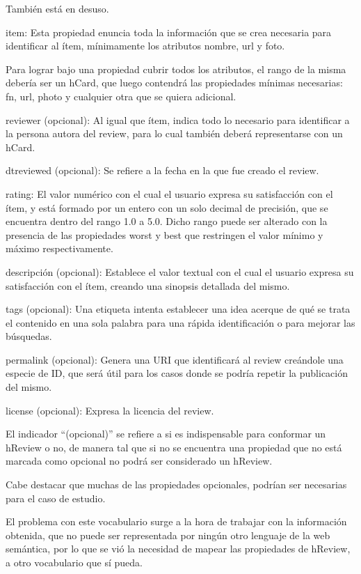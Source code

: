También está en desuso.

item: Esta propiedad enuncia toda la información que se crea necesaria para identificar al ítem, mínimamente los atributos nombre, url y foto.


Para lograr bajo una propiedad cubrir todos los atributos, el rango de la misma debería ser un hCard, que luego contendrá las propiedades mínimas necesarias: 
fn, url, photo y cualquier otra que se quiera adicional.

reviewer (opcional): Al igual que ítem, indica todo lo necesario para identificar a la persona autora del review, para lo cual también deberá representarse 
con un hCard. 

dtreviewed (opcional): Se refiere a la fecha en la que fue creado el review. 

rating: El valor numérico con el cual el usuario expresa su satisfacción con el ítem, y está formado por un entero con un solo decimal 
de precisión, que se encuentra dentro del rango 1.0 a 5.0. Dicho rango puede ser alterado con la presencia de las propiedades worst y best 
que restringen el valor mínimo y máximo respectivamente.

descripción (opcional): Establece el valor textual con el cual el usuario expresa su satisfacción con el ítem, creando una 
sinopsis detallada del mismo. 

tags (opcional): Una etiqueta intenta establecer una idea acerque de qué se trata el contenido en una sola palabra para una rápida identificación 
o para mejorar las búsquedas. 

permalink (opcional): Genera una URI que identificará al review creándole una especie de ID, que será útil para los casos donde 
se podría repetir la publicación del mismo. 

license (opcional): Expresa la licencia del review.

El indicador ``(opcional)'' se refiere a si es indispensable para conformar un hReview o no, de manera tal que si no se encuentra una 
propiedad que no está marcada como opcional no podrá ser considerado un hReview.

Cabe destacar que muchas de las propiedades opcionales, podrían ser necesarias para el caso de estudio.

El problema con este vocabulario surge a la hora de trabajar con la información obtenida, que no puede ser representada por ningún otro 
lenguaje de la web semántica, por lo que se vió la necesidad de mapear las propiedades de hReview, a otro vocabulario que sí pueda.

